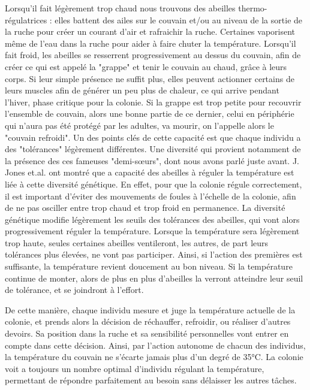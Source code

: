 			Lorsqu'il fait légèrement trop chaud nous trouvons des abeilles thermo-régulatrices : elles battent des ailes sur le couvain et/ou au niveau de la sortie de la ruche pour créer un courant d'air et rafraichir la ruche. Certaines vaporisent même de l'eau dans la ruche pour aider à faire chuter la température. Lorsqu'il fait froid, les abeilles se resserrent progressivement au dessus du couvain, afin de créer ce qui est appelé la "grappe" et tenir le couvain au chaud, grâce à leurs corps. Si leur simple présence ne suffit plus, elles peuvent actionner certains de leurs muscles afin de générer un peu plus de chaleur, ce qui arrive pendant l'hiver, phase critique pour la colonie. Si la grappe est trop petite pour recouvrir l'ensemble de couvain, alors une bonne partie de ce dernier, celui en périphérie qui n'aura pas été protégé par les adultes, va mourir, on l'appelle alors le "couvain refroidi".		
			Un des points clés de cette capacité est que chaque individu a des "tolérances" légèrement différentes. Une diversité qui provient notamment de la présence des ces fameuses "demi-sœurs", dont nous avons parlé juste avant. J. Jones et.al. \cite{jones_honey_2004} ont montré que a capacité des abeilles à réguler la température est liée à cette diversité génétique. En effet, pour que la colonie régule correctement, il est important d'éviter des mouvements de foules à l'échelle de la colonie, afin de ne pas osciller entre trop chaud et trop froid en permanence. La diversité génétique modifie légèrement les seuils des tolérances des abeilles, qui vont alors progressivement réguler la température. Lorsque la température sera légèrement trop haute, seules certaines abeilles ventileront, les autres, de part leurs tolérances plus élevées, ne vont pas participer. Ainsi, si l'action des premières est suffisante, la température revient doucement au bon niveau. Si la température continue de monter, alors de plus en plus d'abeilles la verront atteindre leur seuil de tolérance, et se joindront à l'effort.
			
			De cette manière, chaque individu mesure et juge la température actuelle de la colonie, et prends alors la décision de réchauffer, refroidir, ou réaliser d'autres devoirs. Sa position dans la ruche et sa sensibilité personnelles vont entrer en compte dans cette décision. Ainsi, par l'action autonome de chacun des individus, la température du couvain ne s'écarte jamais plus d'un degré de 35°C. La colonie voit a toujours un nombre optimal d'individu régulant la température, permettant de répondre parfaitement au besoin sans délaisser les autres tâches.
			
